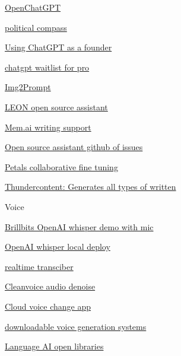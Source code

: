          \href{https://github.com/LAION-AI/Open-Assistant}{OpenChatGPT}
         
          \href{https://www.gptoverflow.link/question/1519492600837443584/chatgpt-political-compass}{political
          compass}
         
          \href{https://www.atomic14.com/2022/12/05/using-chatgpt-as-a-co-founder.html}{Using
          ChatGPT as a founder}
         
          \href{https://docs.google.com/forms/d/e/1FAIpQLScwuQEWBkxsNftEkvUgFx2Ov7pKcrOx8IUlZ241lvet7ziXCQ/viewform?fbzx=-7085331511137611549}{chatgpt
          waitlist for pro}
         
       
        \href{https://replicate.com/methexis-inc\#}{Img2Prompt}
       
        \href{https://docs.getleon.ai/}{LEON open source assistant}
       
        \href{https://support.mem.ai/article/97-mem-x-smart-write-and-edit\#funny}{Mem.ai
        writing support}
       
        \href{https://github.com/LAION-AI/Open-Assistant/issues}{Open
        source assistant github of issues}
       
        \href{https://arxiv.org/abs/2209.01188}{Petals collaborative
        fine tuning}
       
        \href{https://thundercontent.com/features}{Thundercontent:
        Generates all types of written}
       
     
      Voice

       
      \tightlist
       
        \href{https://www.youtube.com/watch?v=nwPaRSlDSaY}{Brillbits
        OpenAI whisper demo with mic}
       
        \href{https://github.com/openai/whisper}{OpenAI whisper local
        deploy}

         
        \tightlist
         
          \href{https://github.com/davabase/transcriber_app/}{realtime
          transciber}
         
       
        \href{https://cleanvoice.ai/}{Cleanvoice audio denoise}
       
        \href{https://voice.ai/}{Cloud voice change app}
       
        \href{https://github.com/neonbjb/tortoise-tts}{downloadable
        voice generation systems}
       
        \href{https://txt.cohere.ai/introducing-sandbox-coheres-experimental-open-source-initiative/}{Language
        AI open libraries}
       
